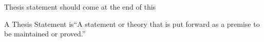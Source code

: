 \par
\noindent
Thesis statement should come at the end of this

A Thesis Statement is“A statement or theory that is put forward as a premise to be maintained or proved.”





